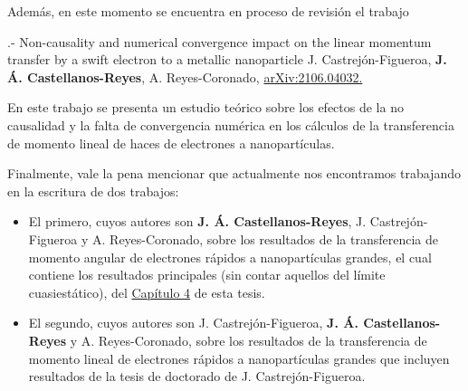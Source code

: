 Además, en este momento se encuentra en proceso de revisión el trabajo

\vspace{0.5cm}
%
%
\begin{mybox2}{.- Non-causality and numerical convergence impact on the linear momentum transfer by a swift electron to a metallic nanoparticle}
	J. Castrejón-Figueroa, \textbf{J. Á. Castellanos-Reyes}, A. Reyes-Coronado, 
	\href{https://arxiv.org/abs/2106.04032}{arXiv:2106.04032.}
\end{mybox2}{}
%
En este trabajo se presenta un estudio teórico sobre los efectos de la no causalidad y la falta de convergencia numérica en los cálculos de la transferencia de momento lineal de haces de electrones a nanopartículas.
\vspace{0.5cm}

Finalmente, vale la pena mencionar que actualmente nos encontramos trabajando en la escritura de dos trabajos:
%
\begin{itemize}
	\item El primero, cuyos autores son \textbf{J. Á. Castellanos-Reyes}, J. Castrejón-Figueroa y A. Reyes-Coronado, sobre los resultados de la transferencia de momento angular de electrones rápidos a nanopartículas grandes, el cual contiene los resultados principales (sin contar aquellos del límite cuasiestático), del \hyperlink{resultadosydiscusion}{Capítulo 4} de esta tesis.
	\item El segundo, cuyos autores son J. Castrejón-Figueroa, \textbf{J. Á. Castellanos-Reyes} y A. Reyes-Coronado, sobre los resultados de la transferencia de momento lineal de electrones rápidos a nanopartículas grandes que incluyen resultados de la tesis de doctorado de J. Castrejón-Figueroa.
\end{itemize}

